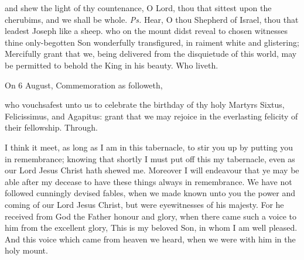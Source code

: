 \introit
{} and shew the light of thy countenance, O Lord, thou that sittest upon the cherubims, and we shall be whole. \textit{Ps.} Hear, O thou Shepherd of Israel, thou that leadest Joseph like a sheep.
\collect
 who on the mount didst reveal to chosen witnesses thine only-begotten Son wonderfully transfigured, in raiment white and glistering; Mercifully grant that we, being delivered from the disquietude of this world, may be permitted to behold the King in his beauty. Who liveth.%

\begin{rubric}
	 On 6 August, Commemoration  as followeth,
\end{rubric}
 who vouchsafest unto us to celebrate the birthday of thy holy Martyrs Sixtus, Felicissimus, and Agapitus: grant that we may rejoice in the everlasting felicity of their fellowship. Through.

 I think it meet, as long as I am in this tabernacle, to stir you up by putting you in remembrance; knowing that shortly I must put off this my tabernacle, even as our Lord Jesus Christ hath shewed me. Moreover I will endeavour that ye may be able after my decease to have these things always in remembrance. We have not followed cunningly devised fables, when we made known unto you the power and coming of our Lord Jesus Christ, but were eyewitnesses of his majesty. For he received from God the Father honour and glory, when there came such a voice to him from the excellent glory, This is my beloved Son, in whom I am well pleased. And this voice which came from heaven we heard, when we were with him in the holy mount.


